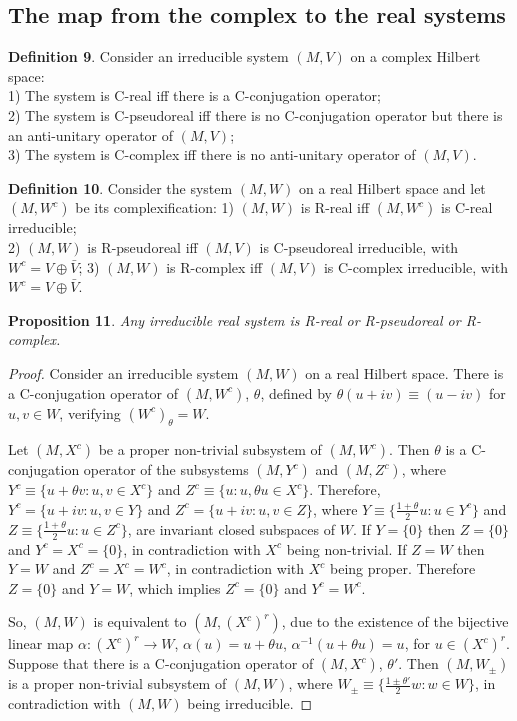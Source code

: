 \documentclass[11pt]{book}
\begin{document}
\hypertarget{the-map-from-the-complex-to-the-real-systems}{%
\subsection{The map from the complex to the real
systems}\label{the-map-from-the-complex-to-the-real-systems}}

\textbf{Definition 9}. Consider an irreducible system \((M,V)\) on a
complex Hilbert space:\\
1) The system is C-real iff there is a C-conjugation operator;\\
2) The system is C-pseudoreal iff there is no C-conjugation operator but
there is an anti-unitary operator of \((M,V)\);\\
3) The system is C-complex iff there is no anti-unitary operator of
\((M,V)\).

\textbf{Definition 10}. Consider the system \((M,W)\) on a real Hilbert
space and let \((M,W^c)\) be its complexification: 1) \((M,W)\) is
R-real iff \((M,W^c)\) is C-real irreducible;\\
2) \((M,W)\) is R-pseudoreal iff \((M,V)\) is C-pseudoreal irreducible,
with \(W^c=V\oplus \bar V\); 3) \((M,W)\) is R-complex iff \((M,V)\) is
C-complex irreducible, with \(W^c=V\oplus \bar V\).

\textbf{Proposition 11}. \emph{Any irreducible real system is R-real or
R-pseudoreal or R-complex.}

\emph{Proof.} Consider an irreducible system \((M,W)\) on a real Hilbert
space. There is a C-conjugation operator of \((M,W^c)\), \(\theta\),
defined by \(\theta(u+iv)\equiv (u-iv)\) for \(u,v\in W\), verifying
\((W^c)_\theta=W\).

Let \((M,X^c)\) be a proper non-trivial subsystem of \((M,W^c)\). Then
\(\theta\) is a C-conjugation operator of the subsystems \((M,Y^c)\) and
\((M,Z^c)\), where \(Y^c\equiv \{u+\theta v: u,v\in X^c\}\) and
\(Z^c\equiv \{u: u,\theta u\in X^c\}\). Therefore,
\(Y^c=\{u+iv: u,v\in Y\}\) and \(Z^c=\{u+iv: u,v\in Z\}\), where
\(Y\equiv\{\frac{1+\theta}{2}u: u\in Y^c\}\) and
\(Z\equiv\{\frac{1+\theta}{2}u: u\in Z^c\}\), are invariant closed
subspaces of \(W\). If \(Y=\{0\}\) then \(Z=\{0\}\) and
\(Y^c=X^c=\{0\}\), in contradiction with \(X^c\) being non-trivial. If
\(Z=W\) then \(Y=W\) and \(Z^c=X^c=W^c\), in contradiction with \(X^c\)
being proper. Therefore \(Z=\{0\}\) and \(Y=W\), which implies
\(Z^c=\{0\}\) and \(Y^c=W^c\).

So, \((M,W)\) is equivalent to \((M,(X^c)^r)\), due to the existence of
the bijective linear map \(\alpha:(X^c)^r\to W\),
\(\alpha(u)=u+\theta u\), \(\alpha^{-1}(u+\theta u)=u\), for
\(u\in(X^c)^r\). Suppose that there is a C-conjugation operator of
\((M,X^c)\), \(\theta'\). Then \((M,W_{\pm})\) is a proper non-trivial
subsystem of \((M,W)\), where
\(W_\pm\equiv\{\frac{1\pm\theta'}{2}w: w\in W\}\), in contradiction with
\((M,W)\) being irreducible.~◻
\end{document}
